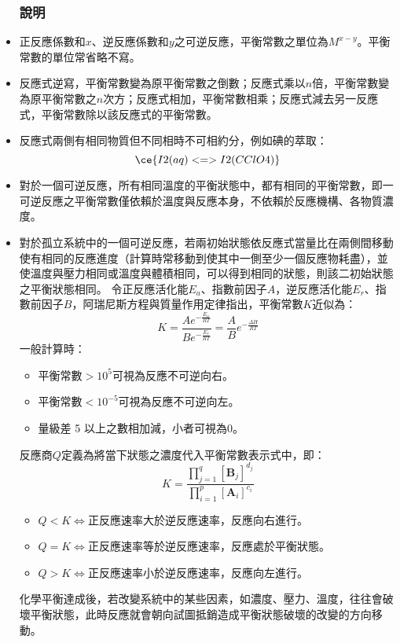 \documentclass[a4paper,12pt]{article}
\begin{document}
\begin{itemize}
\subsubsection{說明}
\bit
\item 正反應係數和$x$、逆反應係數和$y$之可逆反應，平衡常數之單位為$M^{x-y}$。平衡常數的單位常省略不寫。
\item 反應式逆寫，平衡常數變為原平衡常數之倒數；反應式乘以$n$倍，平衡常數變為原平衡常數之$n$次方；反應式相加，平衡常數相乘；反應式減去另一反應式，平衡常數除以該反應式的平衡常數。
\item 反應式兩側有相同物質但不同相時不可相約分，例如碘的萃取：
\[\ce{I2(aq) <=> I2(CClO4)}\]
\item 對於一個可逆反應，所有相同溫度的平衡狀態中，都有相同的平衡常數，即一可逆反應之平衡常數僅依賴於溫度與反應本身，不依賴於反應機構、各物質濃度。
\item 對於孤立系統中的一個可逆反應，若兩初始狀態依反應式當量比在兩側間移動使有相同的反應進度（計算時常移動到使其中一側至少一個反應物耗盡），並使溫度與壓力相同或溫度與體積相同，可以得到相同的狀態，則該二初始狀態之平衡狀態相同。
\eit
{}
令正反應活化能$E_a$、指數前因子$A$，逆反應活化能$E_r$、指數前因子$B$，阿瑞尼斯方程與質量作用定律指出，平衡常數$K$近似為：
\[K=\frac{Ae^{-\frac{E_a}{RT}}}{Be^{-\frac{E_r}{RT}}}=\frac{A}{B}e^{-\frac{\Delta H}{RT}}\]
一般計算時：
\begin{itemize}
\item 平衡常數$>10^5$可視為反應不可逆向右。
\item 平衡常數$<10^{-5}$可視為反應不可逆向左。
\item 量級差 5 以上之數相加減，小者可視為0。
\end{itemize}
反應商$Q$定義為將當下狀態之濃度代入平衡常數表示式中，即：
\[K=\frac{\prod_{j=1}^q[\mathbf{B}_j]^{d_j}}{\prod_{i=1}^p[\mathbf{A}_i]^{c_i}}\]
\begin{itemize}
\item $Q<K\iff$正反應速率大於逆反應速率，反應向右進行。
\item $Q=K\iff$正反應速率等於逆反應速率，反應處於平衡狀態。
\item $Q>K\iff$正反應速率小於逆反應速率，反應向左進行。
\end{itemize}
化學平衡達成後，若改變系統中的某些因素，如濃度、壓力、溫度，往往會破壞平衡狀態，此時反應就會朝向試圖抵銷造成平衡狀態破壞的改變的方向移動。
\begin{itemize}

\end{itemize}
\end{itemize}
\end{document}
